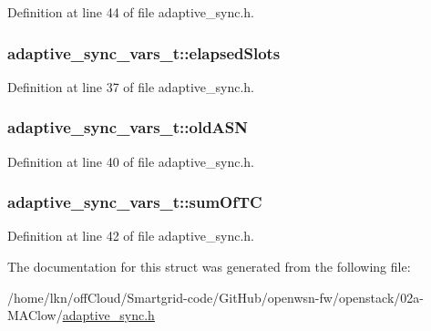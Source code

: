 Definition at line 44 of file adaptive\+\_\+sync.\+h.

\subsubsection[{\texorpdfstring{elapsed\+Slots}{elapsedSlots}}]{ adaptive\+\_\+sync\+\_\+vars\+\_\+t\+::elapsed\+Slots}\hypertarget{structadaptive__sync__vars__t_aac84585b1d30f513f9c66c6a5562a35a}{}\label{structadaptive__sync__vars__t_aac84585b1d30f513f9c66c6a5562a35a}


Definition at line 37 of file adaptive\+\_\+sync.\+h.

\subsubsection[{\texorpdfstring{old\+A\+SN}{oldASN}}]{ adaptive\+\_\+sync\+\_\+vars\+\_\+t\+::old\+A\+SN}\hypertarget{structadaptive__sync__vars__t_a40b6e391a347fcbc4aea2c79e358f925}{}\label{structadaptive__sync__vars__t_a40b6e391a347fcbc4aea2c79e358f925}


Definition at line 40 of file adaptive\+\_\+sync.\+h.

\subsubsection[{\texorpdfstring{sum\+Of\+TC}{sumOfTC}}]{ adaptive\+\_\+sync\+\_\+vars\+\_\+t\+::sum\+Of\+TC}\hypertarget{structadaptive__sync__vars__t_a6a94083f386c91f828fc8ba347dda350}{}\label{structadaptive__sync__vars__t_a6a94083f386c91f828fc8ba347dda350}


Definition at line 42 of file adaptive\+\_\+sync.\+h.



The documentation for this struct was generated from the following file\+:\begin{DoxyCompactItemize}
\item 
/home/lkn/off\+Cloud/\+Smartgrid-\/code/\+Git\+Hub/openwsn-\/fw/openstack/02a-\/\+M\+A\+Clow/\hyperlink{adaptive__sync_8h}{adaptive\+\_\+sync.\+h}\end{DoxyCompactItemize}
